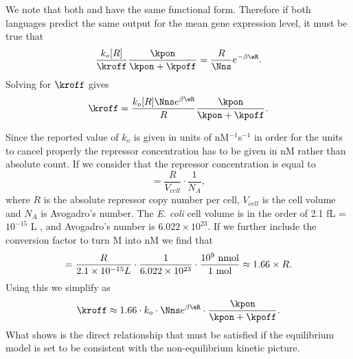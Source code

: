 We note that both  and  have the same
functional form. Therefore if both languages predict the same output for the
mean gene expression level, it must be true that
\begin{equation}
  {k_o [R] \over \kroff}{\kpon \over \kpon + \kpoff} =
  {R \over \Nns} e^{-\beta\eR}.
\end{equation}
Solving for $\kroff$ gives
\begin{equation}
  \kroff = {k_o [R] \Nns e^{\beta\eR} \over R}{\kpon \over \kpon + \kpoff}.
  \label{seq_kroff_complete}
\end{equation}

Since the reported value of $k_o$ is given in units of nM$^{-1}$s$^{-1}$ in
order for the units to cancel properly the repressor concentration has to be
given in nM rather than absolute count. If we consider that the repressor
concentration is equal to
\begin{equation}
[R] = \frac{R}{V_{cell}}\cdot \frac{1}{N_A},
\end{equation}
where $R$ is the absolute repressor copy number per cell, $V_{cell}$ is the cell
volume and $N_A$ is Avogadro's number. The \textit{E. coli} cell volume is in
the order of 2.1 fL = $10^{-15}$ L , and
Avogadro's number is $6.022 \times 10^{23}$. If we further include the
conversion factor to turn M into nM we find that
\begin{equation}
[R] = {R \over 2.1 \times 10^{-15} L} \cdot {1 \over 6.022 \times 10^{23}}
\cdot {10^9 \text{ nmol} \over 1 \text{ mol}} \approx 1.66 \times R.
\end{equation}
Using this we simplify  as
\begin{equation}
  \kroff \approx 1.66 \cdot k_o \cdot \Nns e^{\beta\eR}
   \cdot {\kpon \over \kpon + \kpoff}.
  \label{seq_kroff}
\end{equation}
What  shows is the direct relationship that must be satisfied if
the equilibrium model is set to be consistent with the non-equilibrium kinetic
picture.
